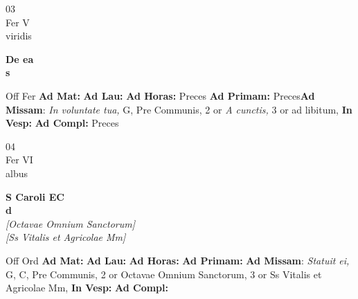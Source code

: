 \documentclass[10pt, openany]{book}
\begin{document}
    \begin{center}
        \begin{minipage}{3.5in}
            \vspace{2em}
            \begin{minipage}{0.5in}
                {\Huge 03} \\
                {\normalsize Fer V} \\
                {\normalsize viridis}
            \end{minipage}
            \begin{minipage}{3.0in}
                \textbf{ \large De ea \\
                \textnormal{\normalsize s}} \\ 
            \end{minipage}
            \begin{justify}Off Fer
                \textbf{Ad Mat: }
                \textbf{Ad Lau: }
                \textbf{Ad Horas: }Preces
                \textbf{Ad Primam: }Preces\textbf{Ad Missam}: \textit{In voluntate tua,} G, Pre Communis, 2 or \textit{A cunctis,} 3 or ad libitum,  
                \textbf{In Vesp: }
                \textbf{Ad Compl: }Preces
            \end{justify}
        \end{minipage}
    \end{center}

    \begin{center}
        \begin{minipage}{3.5in}
            \vspace{2em}
            \begin{minipage}{0.5in}
                {\Huge 04} \\
                {\normalsize Fer VI} \\
                {\normalsize albus}
            \end{minipage}
            \begin{minipage}{3.0in}
                \textbf{ \large S Caroli EC \\
                \textnormal{\normalsize d}} \\ \textit{[Octavae Omnium Sanctorum]} \\ \textit{[Ss Vitalis et Agricolae Mm]} \\ 
            \end{minipage}
            \begin{justify}Off Ord
                \textbf{Ad Mat: }
                \textbf{Ad Lau: }
                \textbf{Ad Horas: }
                \textbf{Ad Primam: }\textbf{Ad Missam}: \textit{Statuit ei,} G, C, Pre Communis, 2 or Octavae Omnium Sanctorum, 3 or Ss Vitalis et Agricolae Mm,  
                \textbf{In Vesp: }
                \textbf{Ad Compl: }
            \end{justify}
        \end{minipage}
    \end{center}
\end{document}
